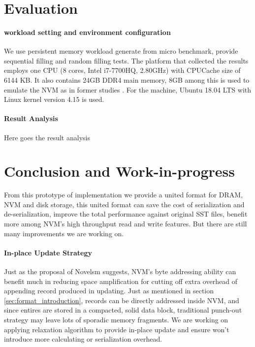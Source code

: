 \section{Evaluation}

\paragraph{workload setting and environment configuration} We use persistent memory workload generate from micro benchmark, provide sequential filling and random filling tests. The platform that collected the results employs one CPU (8 cores, Intel i7-7700HQ, 2.80GHz) with CPUCache size of 6144 KB. It also contains 24GB DDR4 main memory, 8GB among this is used to emulate the NVM as in former studies\cite{kannan2018redesigning,kaiyrakhmet2019slm} . For the machine, Ubuntu 18.04 LTS with Linux kernel version 4.15 is used. 

\paragraph{Result Analysis} Here goes the result analysis



\section{Conclusion and Work-in-progress}
From this prototype of implementation we provide a united format for DRAM, NVM and disk storage, this united format can save the cost of serialization and de-serialization, improve the total performance against original SST files, benefit more among NVM's high throughput read and write features. But there are still many improvements we are working on.

\paragraph{In-place Update Strategy}
Just as the proposal of Novelsm\cite{kannan2018redesigning} suggests, NVM's byte addressing ability can benefit much in reducing space amplification for cutting off extra overhead of appending record produced in updating. Just as mentioned in section \ref{sec:format_introduction}, records can be directly addressed inside NVM, and since entires are stored in a compacted, solid data block, traditional punch-out strategy may leave lots of sporadic memory fragments. We are working on applying relaxation algorithm to provide in-place update and ensure won't introduce more calculating or serialization overhead.

